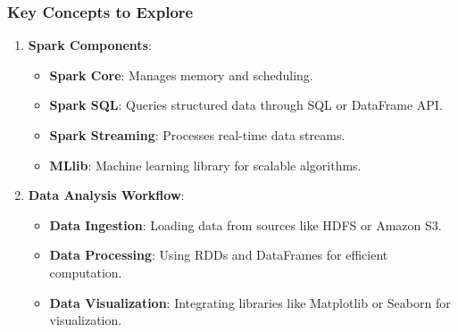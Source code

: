 \documentclass[aspectratio=169]{beamer}
\begin{document}
\begin{frame}[fragile]
    \frametitle{Key Concepts to Explore}
    \begin{enumerate}
        \item \textbf{Spark Components}:
            \begin{itemize}
                \item \textbf{Spark Core}: Manages memory and scheduling.
                \item \textbf{Spark SQL}: Queries structured data through SQL or DataFrame API.
                \item \textbf{Spark Streaming}: Processes real-time data streams.
                \item \textbf{MLlib}: Machine learning library for scalable algorithms.
            \end{itemize}
        \item \textbf{Data Analysis Workflow}:
            \begin{itemize}
                \item \textbf{Data Ingestion}: Loading data from sources like HDFS or Amazon S3.
                \item \textbf{Data Processing}: Using RDDs and DataFrames for efficient computation.
                \item \textbf{Data Visualization}: Integrating libraries like Matplotlib or Seaborn for visualization.
            \end{itemize}
    \end{enumerate}
\end{frame}
\end{document}
